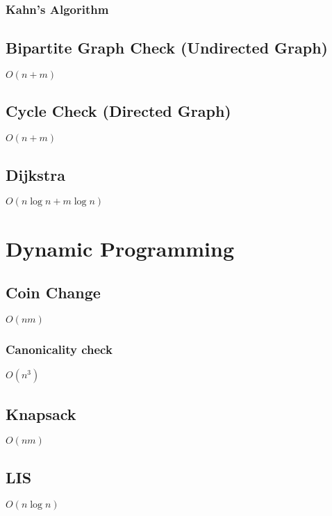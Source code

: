 \documentclass{article}
\begin{document}
\subsubsection{Kahn's Algorithm}


\subsection{Bipartite Graph Check (Undirected Graph)}
$O(n+m)$


\subsection{Cycle Check (Directed Graph)}
$O(n+m)$


\subsection{Dijkstra}
$O(n \log n + m\log n)$


\section{Dynamic Programming}
\subsection{Coin Change}
$O(nm)$


\subsubsection{Canonicality check}
$O(n^3)$


\subsection{Knapsack}
$O(nm)$


\subsection{LIS}
$O(n \log n)$

\end{document}
